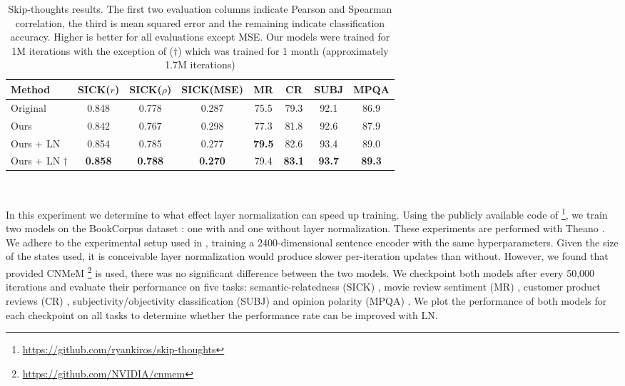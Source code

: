 \documentclass{article}
\begin{document}
\begin{table}
\small
\centering
\begin{tabular}{lccccccc}
\toprule \bf Method & \bf SICK($r$) & \bf SICK($\rho$) & {\bf SICK(}MSE{\bf)} & \bf MR & \bf CR & \bf SUBJ & \bf MPQA \\ \midrule
Original \citep{kiros2015skip} & 0.848 & 0.778 & 0.287 & 75.5 & 79.3 & 92.1 & 86.9  \\ \midrule
Ours & 0.842 & 0.767 & 0.298 & 77.3 & 81.8 & 92.6 & 87.9  \\
Ours + LN & 0.854 & 0.785 & 0.277 & {\bf 79.5} & 82.6 & 93.4 & 89.0   \\
Ours + LN $\dagger$ & {\bf 0.858} & {\bf 0.788} & {\bf 0.270} & 79.4 & {\bf 83.1} & {\bf 93.7} & {\bf 89.3}   \\ \bottomrule
\end{tabular}
    ~\\[-.05in]
\caption{Skip-thoughts results. The first two evaluation columns indicate Pearson and Spearman correlation, the third is mean squared error and the remaining indicate classification accuracy. Higher is better for all evaluations except MSE. Our models were trained for 1M iterations with the exception of ($\dagger$) which was trained for 1 month (approximately 1.7M iterations)}
\label{tab:skipthoughts}
\end{table}


In this experiment we determine to what effect layer normalization can speed up training. Using the publicly available code of \citet{kiros2015skip} \footnote{\url{https://github.com/ryankiros/skip-thoughts}}, we train two models on the BookCorpus dataset \citep{zhu2015aligning}: one with and one without layer normalization. These experiments are performed with Theano \citep{team2016theano}. We adhere to the experimental setup used in \citet{kiros2015skip}, training a 2400-dimensional sentence encoder with the same hyperparameters. Given the size of the states used, it is conceivable layer normalization would produce slower per-iteration updates than without. However, we found that provided CNMeM \footnote{\url{https://github.com/NVIDIA/cnmem}} is used, there was no significant difference between the two models. We checkpoint both models after every 50,000 iterations and evaluate their performance on five tasks: semantic-relatedness (SICK) \citep{marelli2014semeval}, movie review sentiment (MR) \citep{pang2005seeing}, customer product reviews (CR) \citep{hu2004mining}, subjectivity/objectivity classification (SUBJ) \citep{pang2004sentimental} and opinion polarity (MPQA) \citep{wiebe2005annotating}. We plot the performance of both models for each checkpoint on all tasks to determine whether the performance rate can be improved with LN.
\end{document}
